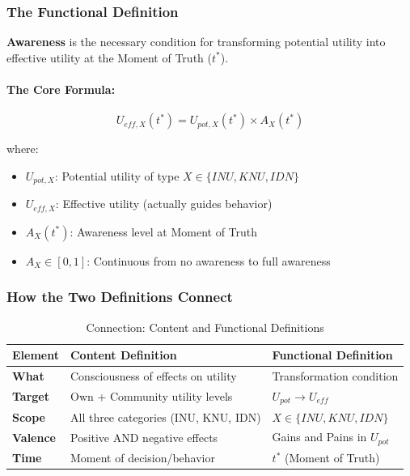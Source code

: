 \subsubsection{The Functional Definition}

\begin{definition}
\label{def:awareness-function}
\textbf{Awareness} is the necessary condition for transforming potential utility
into effective utility at the Moment of Truth ($t^*$).
\end{definition}

\paragraph{The Core Formula:}
\begin{equation}
\boxed{U_{eff,X}(t^*) = U_{pot,X}(t^*) \times A_X(t^*)}
\label{eq:awareness-transformation}
\end{equation}

where:
\begin{itemize}
\item $U_{pot,X}$: Potential utility of type $X \in \{INU, KNU, IDN\}$
\item $U_{eff,X}$: Effective utility (actually guides behavior)
\item $A_X(t^*)$: Awareness level at Moment of Truth
\item $A_X \in [0, 1]$: Continuous from no awareness to full awareness
\end{itemize}

\subsubsection{How the Two Definitions Connect}

\begin{table}[htbp]
\centering
\caption{Connection: Content and Functional Definitions}
\label{tab:definition-connection}
\renewcommand{\arraystretch}{1.4}
\begin{tabular}{@{}lp{5cm}p{5cm}@{}}
\toprule
\textbf{Element} & \textbf{Content Definition} & \textbf{Functional Definition} \\
\midrule
\textbf{What} & Consciousness of effects on utility & Transformation condition \\
\textbf{Target} & Own + Community utility levels & $U_{pot} \rightarrow U_{eff}$ \\
\textbf{Scope} & All three categories (INU, KNU, IDN) & $X \in \{INU, KNU, IDN\}$ \\
\textbf{Valence} & Positive AND negative effects & Gains and Pains in $U_{pot}$ \\
\textbf{Time} & Moment of decision/behavior & $t^*$ (Moment of Truth) \\
\bottomrule
\end{tabular}
\end{table}

